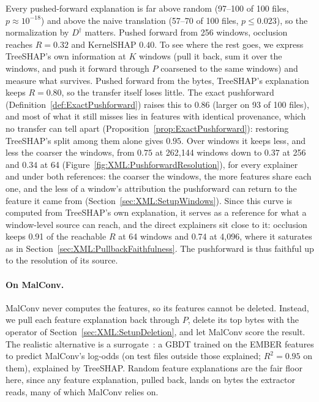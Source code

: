 Every pushed-forward explanation is far above random (97--100 of 100 files, $p \approx 10^{-18}$) and above the naive
translation (57--70 of 100 files, $p \leq 0.023$), so the normalization by $D^\dagger$ matters. Pushed forward from 256
windows, occlusion reaches $R = 0.32$ and KernelSHAP $0.40$. To see where the rest goes, we express TreeSHAP's own
information at $K$ windows (pull it back, sum it over the windows, and push it forward through $P$ coarsened to the same
windows) and measure what survives. Pushed forward from the bytes, TreeSHAP's explanation keeps $R = 0.80$, so the
transfer itself loses little. The exact pushforward (Definition~\ref{def:ExactPushforward}) raises this to $0.86$
(larger on 93 of 100 files), and most of what it still misses lies in features with identical provenance, which no
transfer can tell apart (Proposition~\ref{prop:ExactPushforward}): restoring TreeSHAP's split among them alone gives
$0.95$. Over windows it keeps less, and less the coarser the windows, from $0.75$ at 262{,}144
windows down to $0.37$ at 256 and $0.34$ at 64 (Figure~\ref{fig:XML:PushforwardResolution}), for every explainer and
under both references: the coarser the windows, the more features share each one, and the less of a window's
attribution the pushforward can return to the feature it came from (Section~\ref{sec:XML:SetupWindows}). Since this
curve is computed from TreeSHAP's own explanation, it serves as a reference for what a window-level source can reach,
and the direct explainers sit close to it: occlusion keeps 0.91 of the reachable $R$ at 64 windows and 0.74 at 4{,}096,
where it saturates as in Section~\ref{sec:XML:PullbackFaithfulness}. The pushforward is thus faithful up to the
resolution of its source.



\paragraph{On MalConv.} MalConv never computes the features, so its features cannot be deleted. Instead, we pull each
feature explanation back through $P$, delete its top bytes with the operator of
Section~\ref{sec:XML:SetupDeletion}, and let MalConv score the result. The realistic alternative is a surrogate~\cite{craven1996extracting,
frosst2017distilling}: a GBDT trained on the EMBER features to predict MalConv's log-odds (on test files outside those explained;
$R^2 = 0.95$ on them), explained by TreeSHAP. Random feature explanations are the fair floor here, since any feature
explanation, pulled back, lands on bytes the extractor reads, many of which MalConv relies on.

